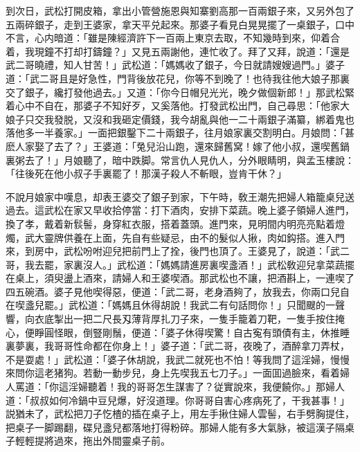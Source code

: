到次日，武松打開皮箱，拿出小管營施恩與知寨劉高那一百兩銀子來，又另外包了五兩碎銀子，走到王婆家，拿天平兑起來。那婆子看見白晃晃擺了一桌銀子，口中不言，心内暗道：「雖是陳經濟許下一百兩上東京去取，不知幾時到來，仰着合着，我現鐘不打却打鑄鐘？」又見五兩謝他，連忙收了。拜了又拜，說道：「還是武二哥曉禮，知人甘苦！」武松道：「媽媽收了銀子，今日就請嫂嫂過門。」婆子道：「武二哥且是好急性，門背後放花兒，你等不到晚了！也待我往他大娘子那裏交了銀子，纔打發他過去。」又道：「你今日帽兒光光，晚夕做個新郎！」那武松緊着心中不自在，那婆子不知好歹，又奚落他。打發武松出門，自己尋思：「他家大娘子只交我發脱，又沒和我砸定價錢，我今胡亂與他一二十兩銀子滿纂，綁着鬼也落他多一半養家。」一面把銀鑿下二十兩銀子，往月娘家裏交割明白。月娘問：「甚麽人家娶了去了？」王婆道：「兔兒沿山跑，還來歸舊窝！嫁了他小叔，還喫舊鍋裏粥去了！」月娘聽了，暗中跌脚。常言仇人見仇人，分外眼睛明，與孟玉樓說：「往後死在他小叔子手裏罷了！那漢子殺人不斬眼，豈肯干休？」

不說月娘家中嘆息，却表王婆交了銀子到家，下午時，敎王潮先把婦人箱籠桌兒送過去。這武松在家又早收拾停當：打下酒肉，安排下菜蔬。晚上婆子領婦人進門，換了孝，戴着新䯼髻，身穿紅衣服，搭着蓋頭。進門來，見明間内明亮亮點着燈燭，武大靈牌供養在上面，先自有些疑忌，由不的髮似人揪，肉如鈎搭。進入門來，到房中，武松吩咐迎兒把前門上了拴，後門也頂了。王婆見了，說道：「武二哥，我去罷，家裏沒人。」武松道：「媽媽請進房裏喫盞酒！」武松敎迎兒拿菜蔬擺在桌上，須臾盪上酒來，請婦人和王婆喫酒。那武松也不讓，把酒斟上，一連喫了四五碗酒。婆子見他喫得惡，便道：「武二哥，老身酒夠了，放我去，你兩口兒自在喫盞兒罷。」武松道：「媽媽且休得胡說！我武二有句話問你！」只聞颼的一聲響，向衣底掣出一把二尺長刄薄背厚扎刀子來，一隻手籠着刀靶，一隻手按住掩心，便睜圓怪眼，倒豎剛鬚，便道：「婆子休得喫驚！自古寃有頭債有主，休推睡裏夢裏，我哥哥性命都在你身上！」婆子道：「武二哥，夜晚了，酒醉拿刀弄杖，不是耍處！」武松道：「婆子休胡說，我武二就死也不怕！等我問了這淫婦，慢慢來問你這老猪狗。若動一動步兒，身上先喫我五七刀子。」一面囬過臉來，看着婦人罵道：「你這淫婦聽着！我的哥哥怎生謀害了？従實說來，我便饒你。」那婦人道：「叔叔如何冷鍋中豆兒爆，好沒道理。你哥哥自害心疼病死了，干我甚事！」説猶未了，武松把刀子忔楂的插在桌子上，用左手揪住婦人雲髻，右手劈胸提住，把桌子一脚踢翻，碟兒盞兒都落地打得粉碎。那婦人能有多大氣脉，被這漢子隔桌子輕輕提將過來，拖出外間靈桌子前。

